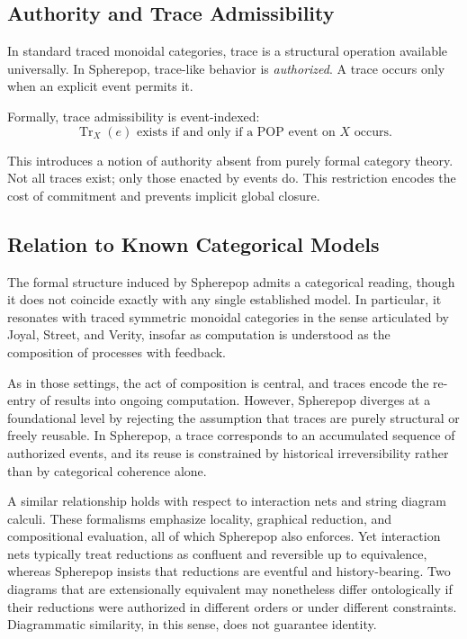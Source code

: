 \documentclass[11pt]{article}
\begin{document}
\subsection{Authority and Trace Admissibility}

In standard traced monoidal categories, trace is a structural operation available universally. In Spherepop, trace-like behavior is \emph{authorized}. A trace occurs only when an explicit event permits it.

Formally, trace admissibility is event-indexed:
\[
\operatorname{Tr}_X(e) \text{ exists if and only if a POP event on } X \text{ occurs}.
\]

This introduces a notion of authority absent from purely formal category theory. Not all traces exist; only those enacted by events do. This restriction encodes the cost of commitment and prevents implicit global closure.

\subsection{Relation to Known Categorical Models}

The formal structure induced by Spherepop admits a categorical reading, though it does not coincide exactly with any single established model. In particular, it resonates with traced symmetric monoidal categories in the sense articulated by Joyal, Street, and Verity, insofar as computation is understood as the composition of processes with feedback. 

As in those settings, the act of composition is central, and traces encode the re-entry of results into ongoing computation. However, Spherepop diverges at a foundational level by rejecting the assumption that traces are purely structural or freely reusable. In Spherepop, a trace corresponds to an accumulated sequence of authorized events, and its reuse is constrained by historical irreversibility rather than by categorical coherence alone.

A similar relationship holds with respect to interaction nets and string diagram calculi. These formalisms emphasize locality, graphical reduction, and compositional evaluation, all of which Spherepop also enforces. Yet interaction nets typically treat reductions as confluent and reversible up to equivalence, whereas Spherepop insists that reductions are eventful and history-bearing. Two diagrams that are extensionally equivalent may nonetheless differ ontologically if their reductions were authorized in different orders or under different constraints. Diagrammatic similarity, in this sense, does not guarantee identity.
\end{document}
